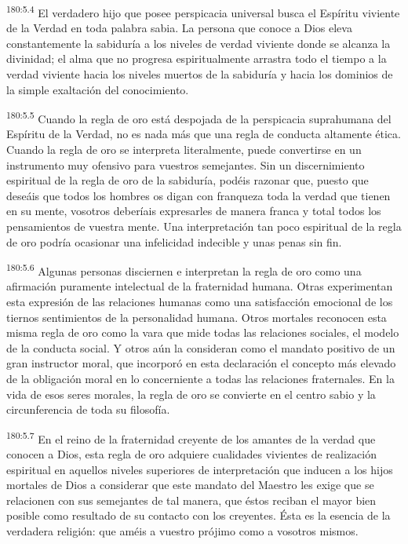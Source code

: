 \par 
\textsuperscript{180:5.4} El verdadero hijo que posee perspicacia universal busca el Espíritu viviente de la Verdad en toda palabra sabia. La persona que conoce a Dios eleva constantemente la sabiduría a los niveles de verdad viviente donde se alcanza la divinidad; el alma que no progresa espiritualmente arrastra todo el tiempo a la verdad viviente hacia los niveles muertos de la sabiduría y hacia los dominios de la simple exaltación del conocimiento.

\par 
\textsuperscript{180:5.5} Cuando la regla de oro está despojada de la perspicacia suprahumana del Espíritu de la Verdad, no es nada más que una regla de conducta altamente ética. Cuando la regla de oro se interpreta literalmente, puede convertirse en un instrumento muy ofensivo para vuestros semejantes. Sin un discernimiento espiritual de la regla de oro de la sabiduría, podéis razonar que, puesto que deseáis que todos los hombres os digan con franqueza toda la verdad que tienen en su mente, vosotros deberíais expresarles de manera franca y total todos los pensamientos de vuestra mente. Una interpretación tan poco espiritual de la regla de oro podría ocasionar una infelicidad indecible y unas penas sin fin.

\par 
\textsuperscript{180:5.6} Algunas personas disciernen e interpretan la regla de oro como una afirmación puramente intelectual de la fraternidad humana. Otras experimentan esta expresión de las relaciones humanas como una satisfacción emocional de los tiernos sentimientos de la personalidad humana. Otros mortales reconocen esta misma regla de oro como la vara que mide todas las relaciones sociales, el modelo de la conducta social. Y otros aún la consideran como el mandato positivo de un gran instructor moral, que incorporó en esta declaración el concepto más elevado de la obligación moral en lo concerniente a todas las relaciones fraternales. En la vida de esos seres morales, la regla de oro se convierte en el centro sabio y la circunferencia de toda su filosofía.

\par 
\textsuperscript{180:5.7} En el reino de la fraternidad creyente de los amantes de la verdad que conocen a Dios, esta regla de oro adquiere cualidades vivientes de realización espiritual en aquellos niveles superiores de interpretación que inducen a los hijos mortales de Dios a considerar que este mandato del Maestro les exige que se relacionen con sus semejantes de tal manera, que éstos reciban el mayor bien posible como resultado de su contacto con los creyentes. Ésta es la esencia de la verdadera religión: que améis a vuestro prójimo como a vosotros mismos.

